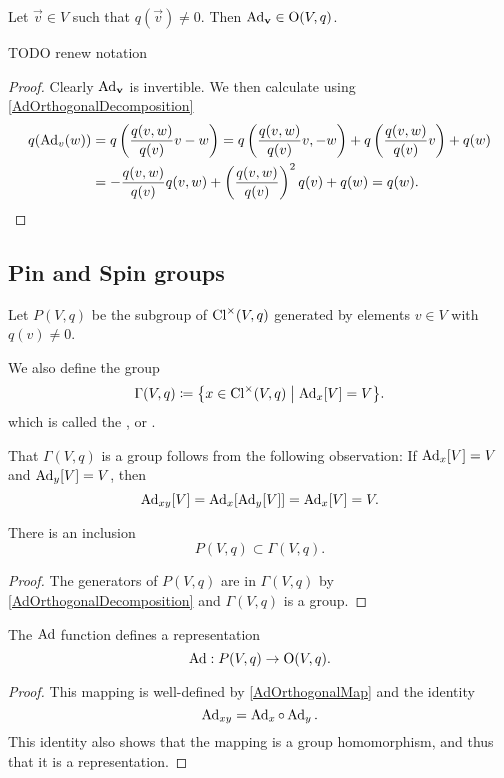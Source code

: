 \begin{lemma} \label{AdOrthogonalMap}
Let $\vec{v}\in V$ such that $q(\vec{v})\neq 0$. Then $\operatorname{Ad}_{\boldsymbol{\mathrm{v}}}\in \operatorname{O}(V,q)$.
\end{lemma}
TODO renew notation
\begin{proof}
Clearly $\operatorname{Ad}_{\boldsymbol{\mathrm{v}}}$ is invertible. We then calculate using \ref{AdOrthogonalDecomposition}
\begin{align*}
q(\operatorname{Ad}_v(w)) &= q\left(\frac{q(v,w)}{q(v)}v - w\right) = q\left(\frac{q(v,w)}{q(v)}v,-w\right) + q\left(\frac{q(v,w)}{q(v)}v\right) + q(w) \\
&= -\frac{q(v,w)}{q(v)}q(v,w)+\left(\frac{q(v,w)}{q(v)}\right)^2q(v) + q(w) = q(w).
\end{align*}
\end{proof}


\subsection{Pin and Spin groups}
\begin{definition}
Let $P(V,q)$ be the subgroup of $\operatorname{Cl}^\times(V,q)$ generated by elements $v\in V$ with $q(v)\neq 0$.

We also define the group
\[ \Gamma(V,q) \defeq \setbuilder{x\in\Cl^\times(V,q)}{\Ad_x[V] = V}. \]
which is called the ,  or .
\end{definition}
That $\Gamma(V,q)$ is a group follows from the following observation: If $\operatorname{Ad}_x[V]=V$ and $\operatorname{Ad}_y[V]=V$, then
\[ \operatorname{Ad}_{xy}[V] = \operatorname{Ad}_x[\operatorname{Ad}_y[V]] = \operatorname{Ad}_x[V] = V. \]


\begin{lemma} \label{PsubgroupVpreserving}
There is an inclusion
\[ P(V,q) \subset \Gamma(V,q). \]
\end{lemma}
\begin{proof}
The generators of $P(V,q)$ are in $\Gamma(V,q)$ by \ref{AdOrthogonalDecomposition} and $\Gamma(V,q)$ is a group.
\end{proof}

\begin{lemma}
The $\operatorname{Ad}$ function defines a representation
\[ \operatorname{Ad}: P(V,q) \to \operatorname{O}(V,q). \]
\end{lemma}
\begin{proof}
This mapping is well-defined by \ref{AdOrthogonalMap} and the identity
\[ \operatorname{Ad}_{xy} = \operatorname{Ad}_x\circ \operatorname{Ad}_y. \]
This identity also shows that the mapping is a group homomorphism, and thus that it is a representation.
\end{proof}

